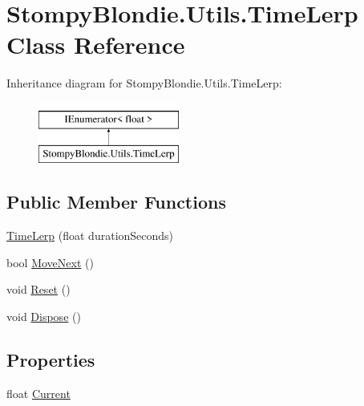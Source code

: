 \hypertarget{class_stompy_blondie_1_1_utils_1_1_time_lerp}{}\section{Stompy\+Blondie.\+Utils.\+Time\+Lerp Class Reference}
\label{class_stompy_blondie_1_1_utils_1_1_time_lerp}
Inheritance diagram for Stompy\+Blondie.\+Utils.\+Time\+Lerp\+:\begin{figure}[H]
\begin{center}
\leavevmode
\includegraphics[height=2.000000cm]{class_stompy_blondie_1_1_utils_1_1_time_lerp}
\end{center}
\end{figure}
\subsection*{Public Member Functions}
\begin{DoxyCompactItemize}
\item 
\mbox{\hyperlink{class_stompy_blondie_1_1_utils_1_1_time_lerp_a29f7e8faa0c774f1be10d5d75f021abb}{Time\+Lerp}} (float duration\+Seconds)
\item 
bool \mbox{\hyperlink{class_stompy_blondie_1_1_utils_1_1_time_lerp_a2919d12fff90522ccbe3d24ade54c6b8}{Move\+Next}} ()
\item 
void \mbox{\hyperlink{class_stompy_blondie_1_1_utils_1_1_time_lerp_a471266f48a72cf51013cc9333b026076}{Reset}} ()
\item 
void \mbox{\hyperlink{class_stompy_blondie_1_1_utils_1_1_time_lerp_a927abfb7ac2193812d8ffb4d557dec3c}{Dispose}} ()
\end{DoxyCompactItemize}
\subsection*{Properties}
\begin{DoxyCompactItemize}
\item 
float \mbox{\hyperlink{class_stompy_blondie_1_1_utils_1_1_time_lerp_a1caee886c2d6305e949dfa241553432f}{Current}}
\end{DoxyCompactItemize}


